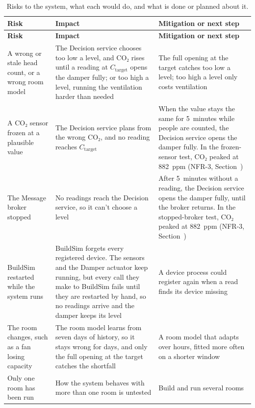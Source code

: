 \documentclass[11pt]{article}
\makeatletter
\newcommand{\reqfield}[2]{\csname req@#1@#2\endcsname}
\newcommand{\req}[1]{\pdftooltip{\hyperlink{req:#1}{#1}}%
  {#1: \reqfield{#1}{text}. Criterion: \reqfield{#1}{criterion}.}}
\def\ref#1{\getrefnumber{#1}}%
\def\req#1{#1}}
\makeatother
\begin{document}
\begin{longtable}[]{@{}
  >{\raggedright\arraybackslash}p{}
  >{\raggedright\arraybackslash}p{}
  >{\raggedright\arraybackslash}p{}@{}}
\caption{Risks to the system, what each would do, and what is done or
planned about it.}\label{tab:risks}\\
\toprule
\textbf{Risk} & \textbf{Impact} & \textbf{Mitigation or next step} \\
\midrule
\endfirsthead
\toprule
\textbf{Risk} & \textbf{Impact} & \textbf{Mitigation or next step} \\
\midrule
\endhead
A wrong or stale head count, or a wrong room model & The Decision
service chooses too low a level, and CO₂ rises until a reading at
$C_\text{target}$ opens the damper fully; or too high a level, running
the ventilation harder than needed & The full opening at the target catches too low a level; too high a level only costs ventilation \\
\midrule
A CO₂ sensor frozen at a plausible value & The Decision service plans
from the wrong CO₂, and no reading reaches $C_\text{target}$ & When the
value stays the same for 5~minutes while people are counted, the
Decision service opens the damper fully. In the frozen-sensor test, CO₂
peaked at 882~ppm (\req{NFR-3}, Section~\ref{sec:evaluation}) \\
\midrule
The Message broker stopped & No readings reach the Decision service, so
it can't choose a level & After 5~minutes without a reading, the
Decision service opens the damper fully, until the broker returns. In
the stopped-broker test, CO₂ peaked at 882~ppm (\req{NFR-3},
Section~\ref{sec:evaluation}) \\
\midrule
BuildSim restarted while the system runs & BuildSim forgets every
registered device. The sensors and the Damper actuator keep running, but
every call they make to BuildSim fails until they are restarted by hand,
so no readings arrive and the damper keeps its level & A device process could
register again when a read finds its device missing \\
\midrule
The room changes, such as a fan losing capacity & The room model learns
from seven days of history, so it stays wrong for days, and only the
full opening at the target catches the shortfall & A room model that
adapts over hours, fitted more often on a shorter window \\
\midrule
Only one room has been run & How the system behaves with more than one
room is untested & Build and run several rooms \\
\bottomrule
\end{longtable}
\end{document}
